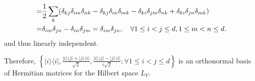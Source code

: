 \documentclass[en]{sol-man}
\begin{document}
\begin{sol}
\begin{itemize}
\begin{itemize}
\begin{align}
                \notag=&\frac{1}{2}\sum_k(\delta_{kj}\delta_{im}\delta_{nk}-\delta_{kj}\delta_{in}\delta_{mk}-\delta_{ki}\delta_{jm}\delta_{nk}+\delta_{ki}\delta_{jn}\delta_{mk})\\
                =&\delta_{im}\delta_{jn}-\delta_{in}\delta_{jm}=\delta_{im}\delta_{jn},\quad\forall 1\leq i<j\leq d,1\leq m<n\leq d.
            \end{align}
            and thus linearly independent.
        \end{itemize}
        Therefore, $\left\{\lvert i\rangle\langle i\rvert,\frac{\lvert i\rangle\langle j\rvert+\lvert j\rangle\langle i\rvert}{\sqrt{2}},\frac{\lvert i\rangle\langle j\rvert-\lvert j\rangle\langle i\rvert}{i\sqrt{2}};\forall 1\leq i<j\leq d\right\}$ is an orthonormal basis of Hermitian matrices for the Hilbert space $L_V$.
    \end{itemize}
\end{sol}
\end{document}
